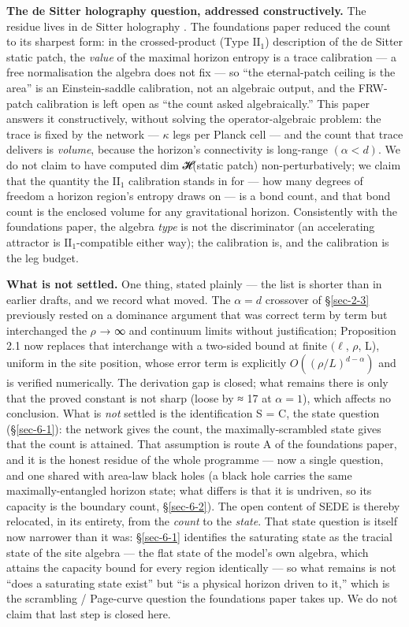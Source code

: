 \documentclass[12pt]{iopart}
\begin{document}
\textbf{The de Sitter holography question, addressed constructively.}
The residue lives in de Sitter holography \citep{Strominger:2001pn}. The
foundations paper reduced the count to its sharpest form: in the
crossed-product (Type \(\mathrm{II}_{1}\)) description of the de Sitter
static patch, the \emph{value} of the maximal horizon entropy is a trace
calibration --- a free normalisation the algebra does not fix --- so
``the eternal-patch ceiling is the area'' is an Einstein-saddle
calibration, not an algebraic output, and the FRW-patch calibration is
left open as ``the count asked algebraically.'' This paper answers it
constructively, without solving the operator-algebraic problem: the
trace is fixed by the network --- \(\kappa\) legs per Planck cell ---
and the count that trace delivers is \emph{volume}, because the
horizon's connectivity is long-range \((\alpha  < d)\). We do not claim
to have computed dim 𝓗(static patch) non-perturbatively; we claim that
the quantity the \(\mathrm{II}_{1}\) calibration stands in for --- how
many degrees of freedom a horizon region's entropy draws on --- is a
bond count, and that bond count is the enclosed volume for any
gravitational horizon. Consistently with the foundations paper, the
algebra \emph{type} is not the discriminator (an accelerating attractor
is \(\mathrm{II}_{1}\)-compatible either way); the calibration is, and
the calibration is the leg budget.

\textbf{What is not settled.} One thing, stated plainly --- the list is
shorter than in earlier drafts, and we record what moved. The
\(\alpha  = d\) crossover of §\ref{sec-2-3} previously rested on a
dominance argument that was correct term by term but interchanged the
\(\rho\) → ∞ and continuum limits without justification; Proposition 2.1
now replaces that interchange with a two-sided bound at finite
\((\ell\), \(\rho\), L), uniform in the site position, whose error term
is explicitly \(O((\rho /L)^{d-\alpha })\) and is verified numerically.
The derivation gap is closed; what remains there is only that the proved
constant is not sharp (loose by ≈ 17 at \(\alpha  = 1\)), which affects
no conclusion. What is \emph{not} settled is the identification S = C,
the state question (§\ref{sec-6-1}): the network gives the count, the
maximally-scrambled state gives that the count is attained. That
assumption is route A of the foundations paper, and it is the honest
residue of the whole programme --- now a single question, and one shared
with area-law black holes (a black hole carries the same
maximally-entangled horizon state; what differs is that it is undriven,
so its capacity is the boundary count, §\ref{sec-6-2}). The open content
of SEDE is thereby relocated, in its entirety, from the \emph{count} to
the \emph{state}. That state question is itself now narrower than it
was: §\ref{sec-6-1} identifies the saturating state as the tracial state
of the site algebra --- the flat state of the model's own algebra, which
attains the capacity bound for every region identically --- so what
remains is not ``does a saturating state exist'' but ``is a physical
horizon driven to it,'' which is the scrambling / Page-curve question
the foundations paper takes up. We do not claim that last step is closed
here.
\end{document}
